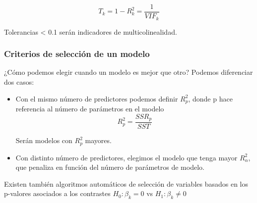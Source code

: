 $$
T_k=1-R^2_k=\frac{1}{VIF_k}
$$

Tolerancias < 0.1 serán indicadores de multicolinealidad.

\subsubsection{Criterios de selección de un modelo}

¿Cómo podemos elegir cuando un modelo es mejor que otro? Podemos diferenciar dos casos:

\begin{itemize}
    \item Con el mismo número de predictores podemos definir $R^2_p$, donde p hace referencia al número de parámetros en el modelo
    $$
    R^2_p=\frac{SSR_p}{SST}
    $$

    Serán modelos con $R^2_p$ mayores.

    \item Con distinto número de predictores, elegimos el modelo que tenga mayor $R^2_\alpha$, que penaliza en función del número de parámetros de modelo.

\end{itemize}

Existen también algoritmos automáticos de selección de variables basados en los p-valores asociados a los contrastes $H_0:\beta_k=0$ vs $H_1:\beta_k\neq0$  

